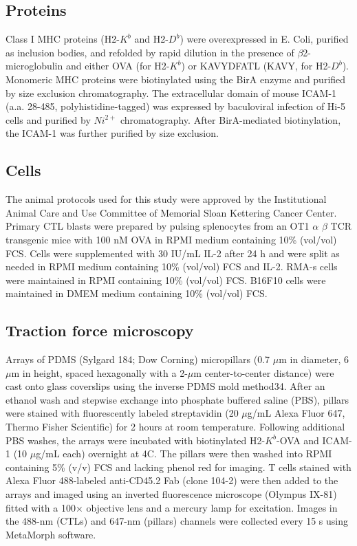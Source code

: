 \subsection{Proteins}
Class I MHC proteins (H2-$K^{b}$ and H2-$D^{b}$) were overexpressed in E. Coli, purified as inclusion bodies, and refolded by rapid dilution in the presence of $\beta$2-microglobulin and either OVA (for H2-$K^{b}$) or KAVYDFATL (KAVY, for H2-$D^{b}$). Monomeric MHC proteins were biotinylated using the BirA enzyme and purified by size exclusion chromatography. The extracellular domain of mouse ICAM-1 (a.a. 28-485, polyhistidine-tagged) was expressed by baculoviral infection of Hi-5 cells and purified by $Ni^{2+}$ chromatography. After BirA-mediated biotinylation, the ICAM-1 was further purified by size exclusion.

\subsection{Cells}
The animal protocols used for this study were approved by the Institutional Animal Care and Use Committee of Memorial Sloan Kettering Cancer Center. Primary CTL blasts were prepared by pulsing splenocytes from an OT1 $\alpha$ $\beta$ TCR transgenic mice with 100 nM OVA in RPMI medium containing 10\% (vol/vol) FCS. Cells were supplemented with 30 IU/mL IL-2 after 24 h and were split as needed in RPMI medium containing 10\% (vol/vol) FCS and IL-2. RMA-s cells were maintained in RPMI containing 10\% (vol/vol) FCS. B16F10 cells were maintained in DMEM medium containing 10\% (vol/vol) FCS.

\subsection{Traction force microscopy}
Arrays of PDMS (Sylgard 184; Dow Corning) micropillars (0.7 $\mu$m in diameter, 6 $\mu$m in height, spaced hexagonally with a 2-$\mu$m center-to-center distance) were cast onto glass coverslips using the inverse PDMS mold method34. After an ethanol wash and stepwise exchange into phosphate buffered saline (PBS), pillars were stained with fluorescently labeled streptavidin (20 $\mu$g/mL Alexa Fluor 647, Thermo Fisher Scientific) for 2 hours at room temperature. Following additional PBS washes, the arrays were incubated with biotinylated H2-$K^{b}$-OVA and ICAM-1 (10 $\mu$g/mL each) overnight at 4\degree C. The pillars were then washed into RPMI containing 5\% (v/v) FCS and lacking phenol red for imaging. T cells stained with Alexa Fluor 488-labeled anti-CD45.2 Fab (clone 104-2) were then added to the arrays and imaged using an inverted fluorescence microscope (Olympus IX-81) fitted with a 100× objective lens and a mercury lamp for excitation. Images in the 488-nm (CTLs) and 647-nm (pillars) channels were collected every 15 s using MetaMorph software.

